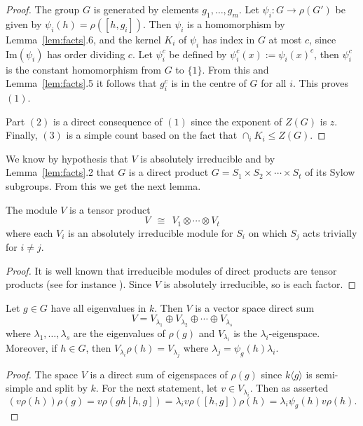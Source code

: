 \begin{proof} 
The group $G$ is generated by 
elements $g_1, \ldots, g_m$. Let $\psi_i:G \rightarrow
\rho(G')$ be given by $\psi_i(h) = \rho([h,g_i])$. 
Then $\psi_i$ is a homomorphism by Lemma~\ref{lem:facts}.6, 
and the  kernel $K_i$ of $\psi_i$ has index in $G$ 
at most $c$, since $\mathrm{Im}(\psi_i)$ has order dividing $c$. 
Let $\psi_i^c$ be defined by  $\psi_i^c(x):= \psi_i(x)^c$, 
then $\psi_i^c$ 
is the constant homomorphism from $G$ to $\{1\}$. From this and         
Lemma~\ref{lem:facts}.5 it follows that $g_i^c$ is in the centre of $G$ 
for all $i$. This proves $(1)$.                                         

Part $(2)$
is a direct consequence of $(1)$ since the exponent of $Z(G)$ is $z$.
Finally, $(3)$ is a simple count based on the fact that
$\cap_i K_i \leq  Z(G)$. 
\end{proof}


We know by hypothesis that $V$ is absolutely 
irreducible and by Lemma~\ref{lem:facts}.2 that 
$G$ is a direct product $G =  S_1 \times S_2 \times \cdots 
\times S_t$ of its Sylow subgroups. From this we get the next lemma.

\begin{Lemm} \label{lem:tensor}
The module $V$ is a tensor product 
\[
V \ \  \cong \ \ V_1 \otimes \cdots \otimes V_t
\]
where each $V_i$ is an absolutely irreducible module for $S_i$ on 
which $S_j$ acts trivially for $i \neq j$. 
\end{Lemm}

\begin{proof}
It is well known that irreducible 
modules of direct products are tensor 
products (see for instance \cite[51.13]{CR0}).  
Since $V$ is absolutely irreducible, so is each factor.
\end{proof}

\begin{Prop}  \label{prop:eigenspace} 
Let
$g \in G$ have all eigenvalues in  $k$.
Then $V$ is a vector space direct sum 
\[
V = V_{\lambda_1} \oplus V_{\lambda_2} \oplus \cdots \oplus V_{\lambda_s}
\]
where $\lambda_1, \ldots, \lambda_s$ are the eigenvalues of $\rho(g)$ and
$V_{\lambda_i}$ is the $\lambda_i$-eigenspace. 
Moreover, if $h \in G$, then $V_{\lambda_i}\rho(h) = V_{\lambda_j}$ 
where $\lambda_j = \psi_g(h)\lambda_i$.
\end{Prop}

\begin{proof}
The space  $V$ is a direct sum of eigenspaces of $\rho(g)$
since $k \langle g \rangle$ is 
semi-simple and split by $k$. For the 
next statement, let $v \in V_{\lambda_i}$. Then as asserted
\[ 
(v \rho(h))\rho(g) = v \rho( gh [h, g])= 
\lambda_i v \rho([h, g])\rho(h) = \lambda_i \psi_g(h) v \rho(h).
\]
\end{proof}

